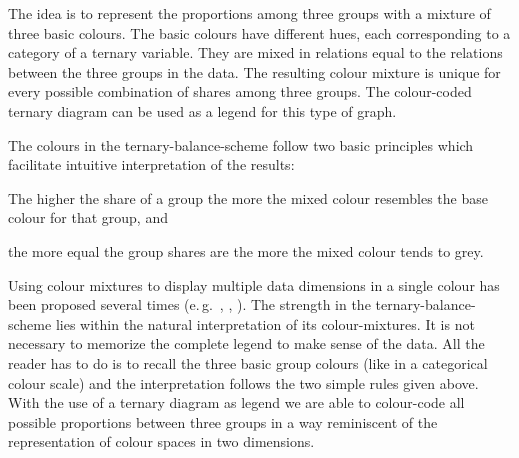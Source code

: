 \documentclass[a4paper]{scrartcl}
\begin{document}
The idea is to represent the proportions among three groups with a mixture of three basic colours. The basic colours have different hues, each corresponding to a category of a ternary variable. They are mixed in relations equal to the relations between the three groups in the data. The resulting colour mixture is unique for every possible combination of shares among three groups. The colour-coded ternary diagram can be used as a legend for this type of graph.

The colours in the ternary-balance-scheme follow two basic principles which facilitate intuitive interpretation of the results:

\begin{compactenum}
  \item The higher the share of a group the more the mixed colour resembles the base colour for that group, and
  \item the more equal the group shares are the more the mixed colour tends to grey.
\end{compactenum}

Using colour mixtures to display multiple data dimensions in a single colour has been proposed several times (e.\,g.~\cite{Trumbo1981}, \cite{Eyton1984}, \cite{Ware1988}). The strength in the ternary-balance-scheme lies within the natural interpretation of its colour-mixtures. It is not necessary to memorize the complete legend to make sense of the data. All the reader has to do is to recall the three basic group colours (like in a categorical colour scale) and the interpretation follows the two simple rules given above. With the use of a ternary diagram as legend we are able to colour-code all possible proportions between three groups in a way reminiscent of the representation of colour spaces in two dimensions.
\end{document}
